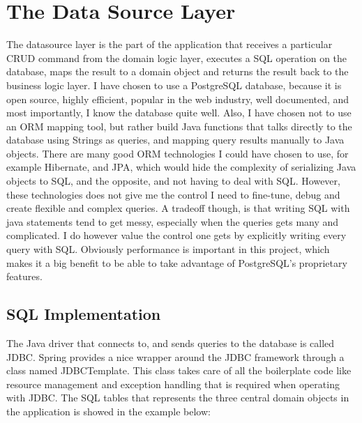 \section{The Data Source Layer}
The datasource layer is the part of the application that receives a particular CRUD command from the domain logic layer, executes a SQL operation on the database, maps the result to a domain object and returns the result back to the business logic layer. I have chosen to use a PostgreSQL database, because it is open source, highly efficient, popular in the web industry, well documented, and most importantly, I know the database quite well. Also, I have chosen not to use an ORM mapping tool, but rather build Java functions that talks directly to the database using Strings as queries, and mapping query results manually to Java objects. There are many good ORM technologies I could have chosen to use, for example Hibernate, and JPA, which would hide the complexity of serializing Java objects to SQL, and the opposite, and not having to deal with SQL. However, these technologies does not give me the control I need to fine-tune, debug and create flexible and complex queries. A tradeoff though, is that writing SQL with java statements tend to get messy, especially when the queries gets many and complicated. I do however value the control one gets by explicitly writing every query with SQL. Obviously performance is important in this project, which makes it a big benefit to be able to take advantage of PostgreSQL's proprietary features.
		
\subsection{SQL Implementation}
The Java driver that connects to, and sends queries to the database is called JDBC. Spring provides a nice wrapper around the JDBC framework through a class named JDBCTemplate. This class takes care of all the boilerplate code like resource management and exception handling that is required when operating with JDBC. The SQL tables that represents the three central domain objects in the application is showed in the example below: 
		
